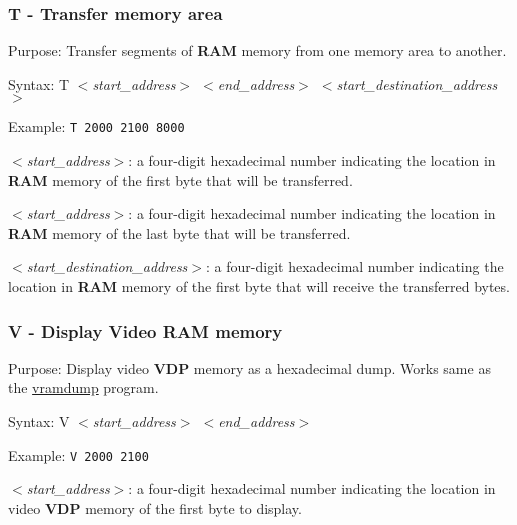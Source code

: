         \subsubsection{T - Transfer memory area}

        Purpose: Transfer segments of \textbf{RAM} memory from one memory area
        to another.

        Syntax: T \textit{$<$start\_address$>$ $<$end\_address$>$
        $<$start\_destination\_address$>$}

        Example: \texttt{T 2000 2100 8000}

        \hspace{1cm}\textit{$<$start\_address$>$}: a four-digit hexadecimal
        number indicating the location in \textbf{RAM} memory of the first byte
        that will be transferred.

        \hspace{1cm}\textit{$<$start\_address$>$}: a four-digit hexadecimal
        number indicating the location in \textbf{RAM} memory of the last byte
        that will be transferred.

        \hspace{1cm}\textit{$<$start\_destination\_address$>$}: a four-digit
        hexadecimal number indicating the location in \textbf{RAM} memory of the
        first byte that will receive the transferred bytes.

        \subsubsection{V - Display Video RAM memory}

        Purpose: Display video \textbf{VDP} memory as a hexadecimal dump. Works
        same as the \hyperref[software:vramdump]{vramdump} program.

        Syntax: V \textit{$<$start\_address$>$ $<$end\_address$>$}

        Example: \texttt{V 2000 2100}

        \hspace{1cm}\textit{$<$start\_address$>$}: a four-digit hexadecimal
        number indicating the location in video \textbf{VDP} memory of the first
        byte to display.

